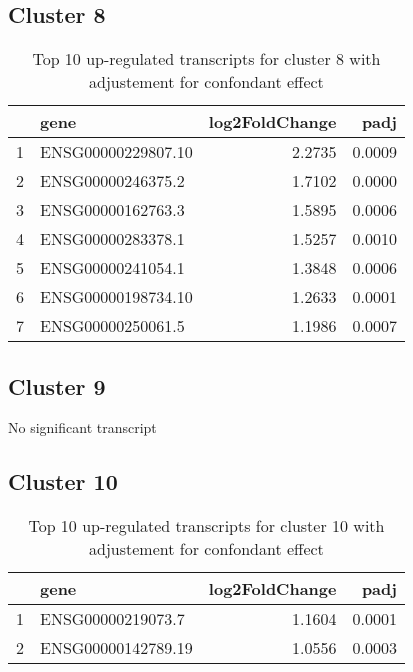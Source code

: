 \documentclass{article}
\begin{document}
\subsection{Cluster 8 }
\begin{table}[H]
\centering
\begin{tabularx}{\textwidth}{rlrr}
  \hline
 & gene & log2FoldChange & padj \\ 
  \hline
1 & ENSG00000229807.10 & 2.2735 & 0.0009 \\ 
  2 & ENSG00000246375.2 & 1.7102 & 0.0000 \\ 
  3 & ENSG00000162763.3 & 1.5895 & 0.0006 \\ 
  4 & ENSG00000283378.1 & 1.5257 & 0.0010 \\ 
  5 & ENSG00000241054.1 & 1.3848 & 0.0006 \\ 
  6 & ENSG00000198734.10 & 1.2633 & 0.0001 \\ 
  7 & ENSG00000250061.5 & 1.1986 & 0.0007 \\ 
   \hline
\end{tabularx}
\caption{Top 10 up-regulated transcripts for cluster 8 with adjustement for confondant effect} 
\label{tab:q3_1_conf_8}
\end{table}
\subsection{Cluster 9 }
No significant transcript
\subsection{Cluster 10 }
\begin{table}[H]
\centering
\begin{tabularx}{\textwidth}{rlrr}
  \hline
 & gene & log2FoldChange & padj \\ 
  \hline
1 & ENSG00000219073.7 & 1.1604 & 0.0001 \\ 
  2 & ENSG00000142789.19 & 1.0556 & 0.0003 \\ 
   \hline
\end{tabularx}
\caption{Top 10 up-regulated transcripts for cluster 10 with adjustement for confondant effect} 
\label{tab:q3_1_conf_10}
\end{table}
\end{document}
